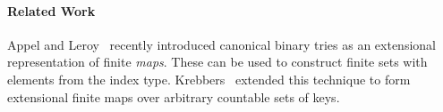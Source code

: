 \documentclass[a4paper]{easychair}
\begin{document}
\paragraph{Related Work}
Appel and Leroy~\cite{appelleroy2023tries} recently introduced canonical binary tries as an extensional representation of finite \emph{maps}.
These can be used to construct finite sets with elements from the index type.
Krebbers~\cite{krebbers2023extensionalmaps} extended this technique to form extensional finite maps over arbitrary countable sets of keys.





%
%
%


\end{document}
